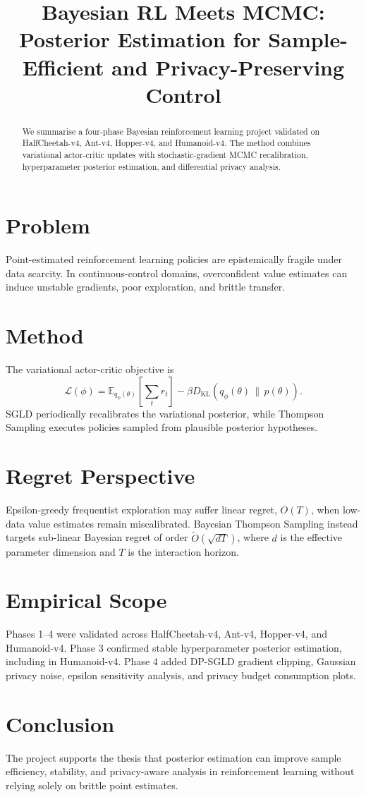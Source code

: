 \documentclass[conference]{IEEEtran}
\title{Bayesian RL Meets MCMC: Posterior Estimation for Sample-Efficient and Privacy-Preserving Control}
\author{\IEEEauthorblockN{Research Engineering Brief}}
\begin{document}
\maketitle

\begin{abstract}
We summarise a four-phase Bayesian reinforcement learning project validated on HalfCheetah-v4, Ant-v4, Hopper-v4, and Humanoid-v4. The method combines variational actor-critic updates with stochastic-gradient MCMC recalibration, hyperparameter posterior estimation, and differential privacy analysis.
\end{abstract}

\section{Problem}
Point-estimated reinforcement learning policies are epistemically fragile under data scarcity. In continuous-control domains, overconfident value estimates can induce unstable gradients, poor exploration, and brittle transfer.

\section{Method}
The variational actor-critic objective is
\[
\mathcal{L}(\phi) =
\mathbb{E}_{q_{\phi}(\theta)}
\left[\sum_t r_t\right]
- \beta D_{\mathrm{KL}}\!\left(q_{\phi}(\theta)\,\|\,p(\theta)\right).
\]
SGLD periodically recalibrates the variational posterior, while Thompson Sampling executes policies sampled from plausible posterior hypotheses.

\section{Regret Perspective}
Epsilon-greedy frequentist exploration may suffer linear regret, $O(T)$, when low-data value estimates remain miscalibrated. Bayesian Thompson Sampling instead targets sub-linear Bayesian regret of order $\tilde{O}(\sqrt{dT})$, where $d$ is the effective parameter dimension and $T$ is the interaction horizon.

\section{Empirical Scope}
Phases 1--4 were validated across HalfCheetah-v4, Ant-v4, Hopper-v4, and Humanoid-v4. Phase 3 confirmed stable hyperparameter posterior estimation, including in Humanoid-v4. Phase 4 added DP-SGLD gradient clipping, Gaussian privacy noise, epsilon sensitivity analysis, and privacy budget consumption plots.

\section{Conclusion}
The project supports the thesis that posterior estimation can improve sample efficiency, stability, and privacy-aware analysis in reinforcement learning without relying solely on brittle point estimates.
\end{document}
